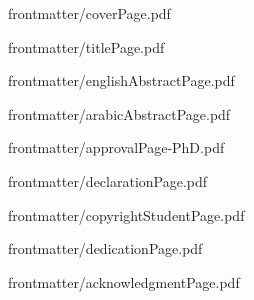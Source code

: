 \documentclass[12pt, a4paper, oneside]{memoir}
\begin{document}
\frontmatter

\pagestyle{plain}


%


{frontmatter/coverPage.pdf}

\setcounter{page}{1}

{frontmatter/titlePage.pdf}


{frontmatter/englishAbstractPage.pdf}


{frontmatter/arabicAbstractPage.pdf}


{frontmatter/approvalPage-PhD.pdf}


{frontmatter/declarationPage.pdf}


%
%

{frontmatter/copyrightStudentPage.pdf}



{frontmatter/dedicationPage.pdf}


{frontmatter/acknowledgmentPage.pdf}

\tableofcontents*
\newpage
\listoftables
\newpage
\listoffigures

\mainmatter
\DoubleSpacing


\backmatter
\printbibliography[title={REFERENCES}]
\end{document}

